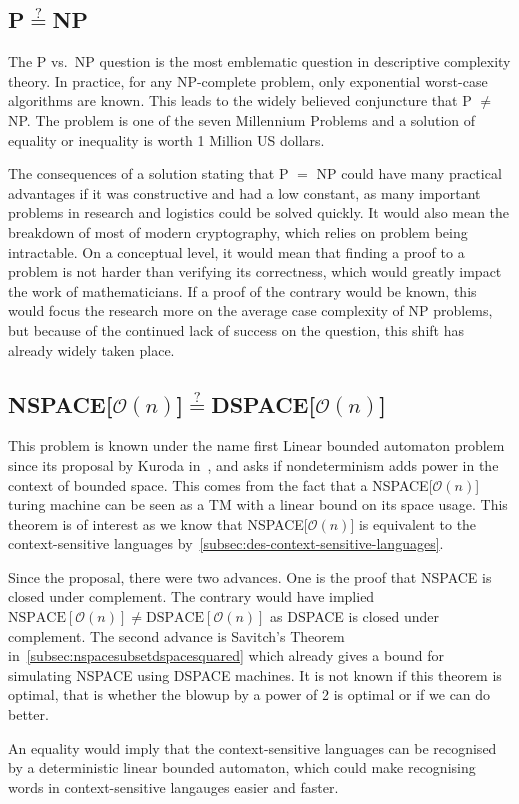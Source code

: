 \subsection{P$\overset{?}{=}$NP}\label{subsec:pnp}
The P vs.~NP question is the most emblematic question in descriptive complexity theory.
In practice, for any NP-complete problem, only exponential worst-case algorithms are known.
This leads to the widely believed conjuncture that P $\neq$ NP\@.
The problem is one of the seven Millennium Problems and a solution of equality or inequality is worth 1 Million US dollars.

The consequences of a solution stating that P $=$ NP could have many practical advantages if it was constructive and had a low constant, as many important problems in research and logistics could be solved quickly.
It would also mean the breakdown of most of modern cryptography, which relies on problem being intractable.
On a conceptual level, it would mean that finding a proof to a problem is not harder than verifying its correctness, which would greatly impact the work of mathematicians.
If a proof of the contrary would be known, this would focus the research more on the average case complexity of NP problems, but because of the continued lack of success on the question, this shift has already widely taken place.

\subsection{NSPACE[$\mathcal{O}(n)$]$\overset{?}{=}$DSPACE[$\mathcal{O}(n)$]}\label{subsec:nspacedspace}

This problem is known under the name first Linear bounded automaton problem since its proposal by Kuroda in~\cite{Kuroda1964}, and asks if nondeterminism adds power in the context of bounded space.
This comes from the fact that a NSPACE[$\mathcal{O}(n)$] turing machine can be seen as a TM with a linear bound on its space usage.
This theorem is of interest as we know that NSPACE[$\mathcal{O}(n)$] is equivalent to the context-sensitive languages by~\cref{subsec:des-context-sensitive-languages}.

Since the proposal, there were two advances.
One is the proof that NSPACE is closed under complement.
The contrary would have implied $\text{NSPACE}[\mathcal{O}(n)] \neq \text{DSPACE}[\mathcal{O}(n)]$ as DSPACE is closed under complement.
The second advance is Savitch's Theorem in~\cref{subsec:nspacesubsetdspacesquared} which already gives a bound for simulating NSPACE using DSPACE machines.
It is not known if this theorem is optimal, that is whether the blowup by a power of 2 is optimal or if we can do better.

An equality would imply that the context-sensitive languages can be recognised by a deterministic linear bounded automaton, which could make recognising words in context-sensitive langauges easier and faster.